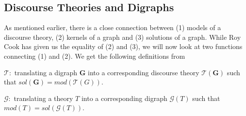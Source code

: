 \subsection{Discourse Theories and Digraphs}
\label{sub:Discourse Theories and Digraphs}
As mentioned earlier, there is a close connection between (1) models of a discourse theory, (2) kernels of a graph and (3) solutions of a graph.
While Roy Cook has given us the equality of (2) and (3), we will now look at two functions connecting (1) and (2).  We get the following definitions from \cite{}

$\mathcal{T}:$ translating a digraph \textbf{G} into a corresponding discourse theory $\mathcal{T}(\mathbf{G})$ such that $sol(\mathbf{G}) = mod(\mathcal{T}(G))$.

$\mathcal{G}:$ translating a theory $T$ into a corresponding digraph $\mathcal{G}(T)$ such that $mod(T) = sol(\mathcal{G}(T))$.
